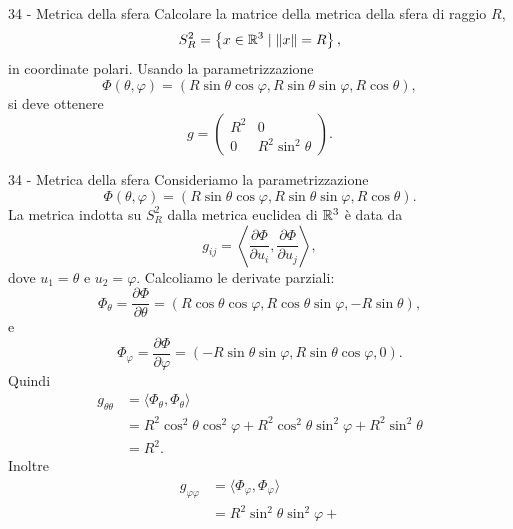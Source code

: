 \documentclass[a4paper]{article}
\begin{document}
\begin{snippetexercise}{34 - Metrica della sfera}
    Calcolare la matrice della metrica della sfera di raggio \(R\),
    \[
        S^2_R=\left\{x\in\mathbb{R}^3\mid \|x\|=R\right\},
    \]
    in coordinate polari. Usando la parametrizzazione
    \[
        \Phi(\theta,\varphi)
        =
        \left(
            R\sin\theta\cos\varphi,
            R\sin\theta\sin\varphi,
            R\cos\theta
        \right),
    \]
    si deve ottenere
    \[
        g
        =
        \begin{pmatrix}
            R^2 & 0\\
            0 & R^2\sin^2\theta
        \end{pmatrix}.
    \]
\end{snippetexercise}

\begin{snippetsolution}{34 - Metrica della sfera}
    Consideriamo la parametrizzazione
    \[
        \Phi(\theta,\varphi)
        =
        \left(
            R\sin\theta\cos\varphi,
            R\sin\theta\sin\varphi,
            R\cos\theta
        \right).
    \]
    La metrica indotta su \(S_R^2\) dalla metrica euclidea di \(\mathbb{R}^3\) è data da
    \[
        g_{ij}=\left\langle \frac{\partial\Phi}{\partial u_i},\frac{\partial\Phi}{\partial u_j}\right\rangle,
    \]
    dove \(u_1=\theta\) e \(u_2=\varphi\).
    Calcoliamo le derivate parziali:
    \[
        \Phi_\theta
        =
        \frac{\partial\Phi}{\partial\theta}
        =
        \left(
            R\cos\theta\cos\varphi,
            R\cos\theta\sin\varphi,
            -R\sin\theta
        \right),
    \]
    e
    \[
        \Phi_\varphi
        =
        \frac{\partial\Phi}{\partial\varphi}
        =
        \left(
            -R\sin\theta\sin\varphi,
            R\sin\theta\cos\varphi,
            0
        \right).
    \]
    Quindi
    \begin{align*}
        g_{\theta\theta}
        &=
        \langle \Phi_\theta,\Phi_\theta\rangle\\
        &=
        R^2\cos^2\theta\cos^2\varphi
        +
        R^2\cos^2\theta\sin^2\varphi
        +
        R^2\sin^2\theta\\
        &=
        R^2.
    \end{align*}
    Inoltre
    \begin{align*}
        g_{\varphi\varphi}
        &=
        \langle \Phi_\varphi,\Phi_\varphi\rangle\\
        &=
        R^2\sin^2\theta\sin^2\varphi
        +

\end{align*}
\end{snippetsolution}
\end{document}
